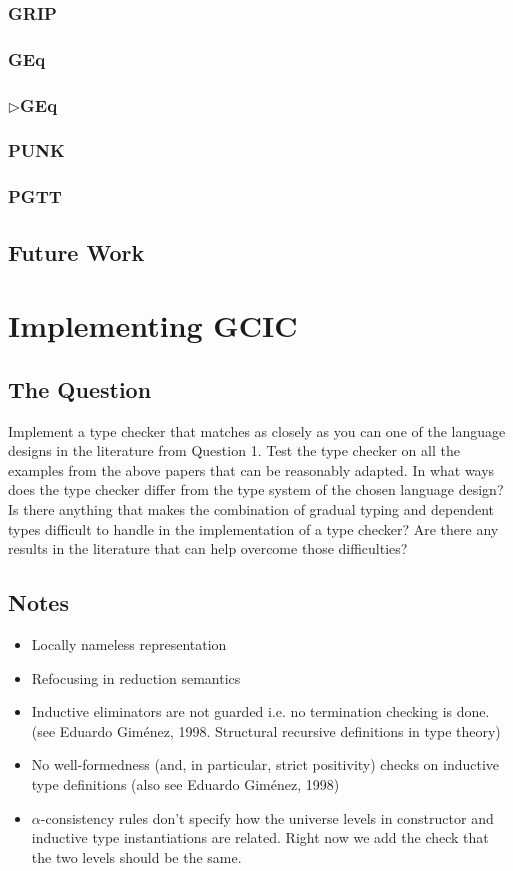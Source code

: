 \documentclass{article}
\newcommand{\GGEq}[0]{\(\triangleright\)GEq}
\begin{document}
\subsubsection{GRIP}
\subsubsection{GEq}
\subsubsection{\GGEq{}}
\subsubsection{PUNK}
\subsubsection{PGTT}

\subsection{Future Work}\label{subsec:future}

\section{Implementing GCIC}

\subsection{The Question}
Implement a type checker that matches as closely as you can one of the language
designs in the literature from Question 1. Test the type checker on all the
examples from the above papers that can be reasonably adapted. In what ways does
the type checker differ from the type system of the chosen language design? Is
there anything that makes the combination of gradual typing and dependent types
difficult to handle in the implementation of a type checker? Are there any
results in the literature that can help overcome those difficulties?

\subsection{Notes}
\begin{itemize}
  \item Locally nameless representation \cite{chargueraud_locally_2012}
  \item Refocusing in reduction semantics \cite{danvy_refocusing_2004}
  \item Inductive eliminators are not guarded i.e. no termination checking is
    done. (see Eduardo Giménez, 1998. Structural recursive definitions in type
    theory)
  \item No well-formedness (and, in particular, strict positivity) checks on inductive
    type definitions (also see Eduardo Giménez, 1998)
  \item \(\alpha\)-consistency rules don't specify how the universe levels in
    constructor and inductive type instantiations are related. Right now we add
    the check that the two levels should be the same.
\end{itemize}
\end{document}
